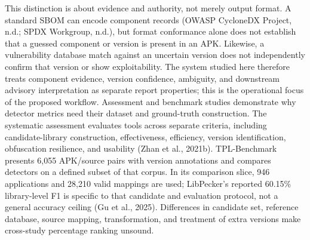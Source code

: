 \documentclass[10pt,twocolumn]{article}
\begin{document}
This distinction is about evidence and authority, not merely output format. A standard SBOM can encode component records (OWASP CycloneDX Project, n.d.; SPDX Workgroup, n.d.), but format conformance alone does not establish that a guessed component or version is present in an APK. Likewise, a vulnerability database match against an uncertain version does not independently confirm that version or show exploitability. The system studied here therefore treats component evidence, version confidence, ambiguity, and downstream advisory interpretation as separate report properties; this is the operational focus of the proposed workflow.
Assessment and benchmark studies demonstrate why detector metrics need their dataset and ground-truth construction. The systematic assessment evaluates tools across separate criteria, including candidate-library construction, effectiveness, efficiency, version identification, obfuscation resilience, and usability (Zhan et al., 2021b). TPL-Benchmark presents 6,055 APK/source pairs with version annotations and compares detectors on a defined subset of that corpus. In its comparison slice, 946 applications and 28,210 valid mappings are used; LibPecker's reported 60.15\% library-level F1 is specific to that candidate and evaluation protocol, not a general accuracy ceiling (Gu et al., 2025). Differences in candidate set, reference database, source mapping, transformation, and treatment of extra versions make cross-study percentage ranking unsound.
\end{document}
